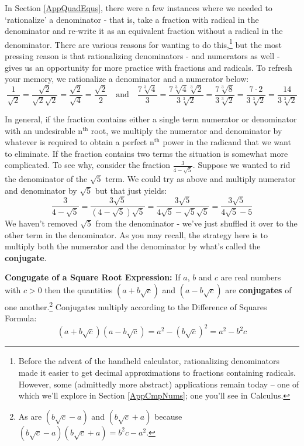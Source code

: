 In Section \ref{AppQuadEqus}, there were a few instances where we needed to `rationalize' a denominator - that is, take a fraction with radical in the denominator and re-write it as an equivalent fraction without a radical in the denominator.  There are various reasons for wanting to do this,\footnote{Before the advent of the handheld calculator, rationalizing denominators made it easier to get decimal approximations to fractions containing radicals.   However, some (admittedly more abstract) applications remain today --  one of which we'll explore in Section \ref{AppCmpNums}; one you'll see in Calculus.} but the most pressing reason is that rationalizing denominators - and numerators as well - gives us an opportunity for more practice with fractions and radicals. To refresh your memory, we rationalize a denominator and a numerator below: \[ \dfrac{1}{\sqrt{2}} = \dfrac{\sqrt{2}}{\sqrt{2} \sqrt{2}} = \dfrac{\sqrt{2}}{\sqrt{4}} = \dfrac{\sqrt{2}}{2} \quad \text{and} \quad \dfrac{7\sqrt[3]{4}}{3} = \dfrac{7 \sqrt[3]{4}\sqrt[3]{2}}{3\sqrt[3]{2}} = \dfrac{7\sqrt[3]{8}}{3\sqrt[3]{2}} = \dfrac{7 \cdot 2}{3\sqrt[3]{2}} =  \dfrac{14}{3\sqrt[3]{2}} \]

In general, if the fraction contains either a single term numerator or denominator with an undesirable $\text{n}^{\text{th}}$ root, we multiply the numerator and denominator by whatever is required to obtain a perfect $\text{n}^{\text{th}}$ power in the radicand that we want to eliminate. If the fraction contains two terms the situation is somewhat more complicated.  To see why, consider the fraction $\frac{3}{4 - \sqrt{5}}$.  Suppose we wanted to rid the denominator of the $\sqrt{5}$ term.  We could try as above and multiply numerator and denominator by $\sqrt{5}$ but that just yields: \[ \dfrac{3}{4 - \sqrt{5}} = \dfrac{3\sqrt{5}}{(4 - \sqrt{5})\sqrt{5}} = \dfrac{3\sqrt{5}}{4\sqrt{5} - \sqrt{5}\sqrt{5}} = \dfrac{3\sqrt{5}}{4\sqrt{5} - 5}\] We haven't removed $\sqrt{5}$ from the denominator - we've just shuffled it over to the other term in the denominator.  As you may recall, the strategy here is to multiply both the numerator and the denominator by what's called the \textbf{conjugate}.  

\begin{tcolorbox}
	
\begin{defn}\label{squarerootconj} \textbf{Congugate of a Square Root Expression:}  If $a$, $b$ and $c$ are real numbers with $c > 0$ then the quantities $(a + b \sqrt{c})$ and $(a - b\sqrt{c})$ are \textbf{conjugates} of one another.\footnote{As are $(b\sqrt{c} -a)$ and $(b\sqrt{c} + a)$ because $(b\sqrt{c} -a)(b\sqrt{c} + a) = b^2c - a^2$.}  Conjugates multiply according to the Difference of Squares Formula:  \[ (a + b \sqrt{c})(a - b\sqrt{c}) = a^2 - (b \sqrt{c})^2 = a^2 - b^2c\]
\end{defn}

\end{tcolorbox}

